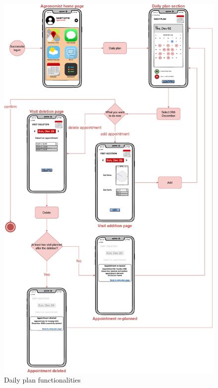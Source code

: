 \begin{center}
    \begin{figure}[H]
        \includegraphics[scale=0.34]{Images/UserInterface/Diagram/DailyPlan.drawio.png}
        \caption{Daily plan functionalities}
    \end{figure}
\end{center}

